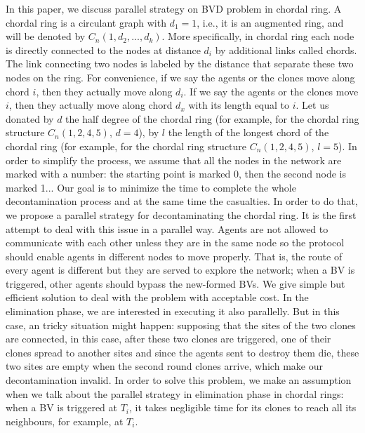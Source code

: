 In this paper, we discuss parallel strategy on BVD problem in chordal ring. A chordal ring is a circulant graph with $d_1=1$, i.e., it is an augmented ring, and will be denoted by $C_n(1, d_2, ..., d_k)$. More specifically, in chordal ring each node is directly connected to the nodes at distance $d_i$ by additional links called chords. The link connecting two nodes is labeled by the distance that separate these two nodes on the ring. 
For convenience, if we say the agents or the clones move along chord $i$, then they actually move along $d_i$. If we say the agents or the clones move $i$, then they actually move along chord $d_x$ with its length equal to $i$. Let us donated by $d$ the half degree of the chordal ring (for example, for the chordal ring structure $C_n(1,2,4,5)$, $d=4$), by $l$ the length of the longest chord of the chordal ring (for example, for the chordal ring structure $C_n(1,2,4,5)$, $l=5$). In order to simplify the process, we assume that all the nodes in the network are marked with a number: the starting point is marked 0, then the second node is marked 1... Our goal is to minimize the time to complete the whole decontamination process and at the same time the casualties. In order to do that, we propose a parallel strategy for decontaminating the chordal ring. It is the first attempt to deal with this issue in a parallel way. Agents are not allowed to communicate with each other unless they are in the same node so the protocol should enable agents in different nodes to move properly. That is, the route of every agent is different but they are served to explore the network; when a BV is triggered, other agents should bypass the new-formed BVs. We give simple but efficient solution to deal with the problem with acceptable cost. 
In the elimination phase, we are interested in executing it also parallelly. But in this case, an tricky situation might happen: supposing that the sites of the two clones are connected, in this case, after these two clones are triggered, one of their clones spread to another sites and since the agents sent to destroy them die, these two sites are empty when the second round clones arrive, which make our decontamination invalid. In order to solve this problem, we make an assumption when we talk about the parallel strategy in elimination phase in chordal rings: when a BV is triggered at $T_i$, it takes negligible time for its clones to reach all its neighbours, for example, at $T_i$.  

